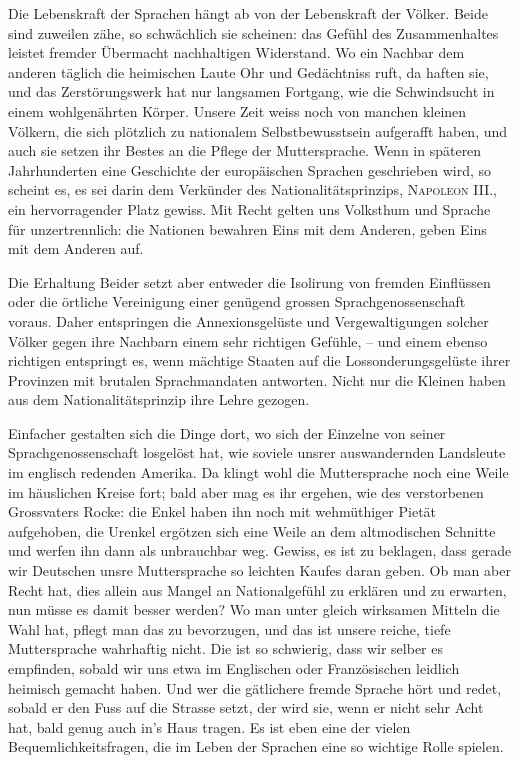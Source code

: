 {Die Lebenskraft der Sprachen hängt ab von der Lebenskraft der Völker. Beide sind zuweilen zähe, so schwächlich sie scheinen: das Gefühl des Zusammenhaltes leistet fremder Übermacht nachhaltigen Widerstand. Wo ein Nachbar dem anderen täglich die heimischen Laute  Ohr und Gedächtniss ruft, da haften sie, und das Zerstörungswerk hat nur langsamen Fortgang, wie die Schwindsucht in einem wohlgenährten Körper. Unsere Zeit weiss noch von manchen kleinen Völkern, die sich plötzlich zu  nationalem Selbstbewusstsein aufgerafft haben, und auch sie setzen ihr Bestes an die Pflege der Muttersprache. Wenn in späteren Jahrhunderten eine Geschichte der europäischen Sprachen geschrieben wird, so scheint es, es sei darin dem Verkünder des Nationalitätsprinzips, \textsc{Napoleon} III., ein hervorragender Platz gewiss. Mit Recht gelten uns Volksthum und Sprache für unzertrennlich: die Nationen bewahren Eins mit dem Anderen, geben Eins mit dem Anderen auf.

\begin{sloppypar}Die Erhaltung Beider setzt aber entweder die Isolirung von fremden Einflüssen oder die örtliche Vereinigung einer genügend grossen Sprachgenossen\-\label{sp.262}schaft voraus. Daher entspringen die Annexionsgelüste und Vergewaltigungen solcher Völker gegen ihre Nachbarn einem sehr richtigen Gefühle, – und einem ebenso richtigen entspringt es, wenn mächtige Staaten auf die Lossonderungsgelüste ihrer Provinzen mit brutalen Sprachmandaten antworten. Nicht nur die Kleinen haben aus dem Nationalitätsprinzip ihre Lehre gezogen.\end{sloppypar}

Einfacher gestalten sich die Dinge dort, wo sich der Einzelne von seiner Sprachgenossenschaft losgelöst hat, wie soviele unsrer auswandernden Landsleute im englisch redenden Amerika. Da klingt wohl die \label{fp.257} Muttersprache noch eine Weile im häuslichen Kreise fort; bald aber mag es ihr ergehen, wie des verstorbenen Grossvaters Rocke: die Enkel haben ihn noch mit wehmüthiger Pietät aufgehoben, die Urenkel ergötzen sich eine Weile an dem altmodischen Schnitte und werfen ihn dann als unbrauchbar weg. Gewiss, es ist zu beklagen, dass gerade wir Deutschen unsre Muttersprache so leichten Kaufes daran geben. Ob man aber Recht hat, dies allein aus Mangel an Nationalgefühl zu erklären und zu erwarten, nun müsse es damit besser werden? Wo man unter gleich wirksamen Mitteln die Wahl hat, pflegt man das  zu bevorzugen, und das ist unsere reiche, tiefe Muttersprache wahrhaftig nicht. Die ist so schwierig, dass wir selber es empfinden, sobald wir uns etwa im Englischen oder Französischen leidlich heimisch gemacht haben. Und wer die gätlichere fremde Sprache hört und redet, sobald er den Fuss auf die Strasse setzt, der wird sie, wenn er nicht sehr Acht hat, bald genug auch in’s Haus tragen. Es ist eben eine der vielen Bequemlichkeitsfragen, die im Leben der Sprachen eine so wichtige Rolle spielen.

}
